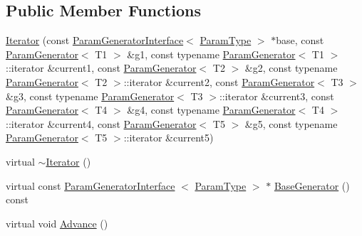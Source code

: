 \subsection*{\-Public \-Member \-Functions}
\begin{DoxyCompactItemize}
\item 
\hyperlink{classtesting_1_1internal_1_1CartesianProductGenerator5_1_1Iterator_ab85a4e12c59d16e51b2f38f94c81c71f}{\-Iterator} (const \hyperlink{classtesting_1_1internal_1_1ParamGeneratorInterface}{\-Param\-Generator\-Interface}$<$ \hyperlink{classtesting_1_1internal_1_1CartesianProductGenerator5_a39880336d68d34bdc77e7e8726d38a91}{\-Param\-Type} $>$ $\ast$base, const \hyperlink{classtesting_1_1internal_1_1ParamGenerator}{\-Param\-Generator}$<$ \-T1 $>$ \&g1, const typename \hyperlink{classtesting_1_1internal_1_1ParamGenerator}{\-Param\-Generator}$<$ \-T1 $>$\-::iterator \&current1, const \hyperlink{classtesting_1_1internal_1_1ParamGenerator}{\-Param\-Generator}$<$ \-T2 $>$ \&g2, const typename \hyperlink{classtesting_1_1internal_1_1ParamGenerator}{\-Param\-Generator}$<$ \-T2 $>$\-::iterator \&current2, const \hyperlink{classtesting_1_1internal_1_1ParamGenerator}{\-Param\-Generator}$<$ \-T3 $>$ \&g3, const typename \hyperlink{classtesting_1_1internal_1_1ParamGenerator}{\-Param\-Generator}$<$ \-T3 $>$\-::iterator \&current3, const \hyperlink{classtesting_1_1internal_1_1ParamGenerator}{\-Param\-Generator}$<$ \-T4 $>$ \&g4, const typename \hyperlink{classtesting_1_1internal_1_1ParamGenerator}{\-Param\-Generator}$<$ \-T4 $>$\-::iterator \&current4, const \hyperlink{classtesting_1_1internal_1_1ParamGenerator}{\-Param\-Generator}$<$ \-T5 $>$ \&g5, const typename \hyperlink{classtesting_1_1internal_1_1ParamGenerator}{\-Param\-Generator}$<$ \-T5 $>$\-::iterator \&current5)
\item 
virtual \hyperlink{classtesting_1_1internal_1_1CartesianProductGenerator5_1_1Iterator_a47b331bac1d130f2bab2c40e76ccb54a}{$\sim$\-Iterator} ()
\item 
virtual const \*
\hyperlink{classtesting_1_1internal_1_1ParamGeneratorInterface}{\-Param\-Generator\-Interface}\*
$<$ \hyperlink{classtesting_1_1internal_1_1CartesianProductGenerator5_a39880336d68d34bdc77e7e8726d38a91}{\-Param\-Type} $>$ $\ast$ \hyperlink{classtesting_1_1internal_1_1CartesianProductGenerator5_1_1Iterator_a297272d14c33d1d5423da2a4776f895b}{\-Base\-Generator} () const 
\item 
virtual void \hyperlink{classtesting_1_1internal_1_1CartesianProductGenerator5_1_1Iterator_aaa5a890708f89affa1a7726cf152c872}{\-Advance} ()

\end{DoxyCompactItemize}
